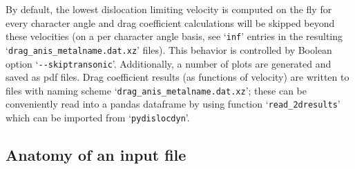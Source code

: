 \documentclass[11pt,letterpaper,oneside]{article}
\begin{document}
By default, the lowest dislocation limiting velocity is computed on the fly for every character angle and drag coefficient calculations will be skipped beyond these velocities (on a per character angle basis, see `\verb|inf|' entries in the resulting `\verb|drag_anis_metalname.dat.xz|' files).
This behavior is controlled by Boolean option `\verb|--skiptransonic|'.
Additionally, a number of plots are generated and saved as pdf files.
Drag coefficient results (as functions of velocity) are written to files with naming scheme `\verb|drag_anis_metalname.dat.xz|';
these can be conveniently read into a pandas dataframe by using function `\verb|read_2dresults|' which can be imported from `\verb|pydislocdyn|'.




\subsection{Anatomy of an input file}
\label{sec:inputfiles}
\end{document}
